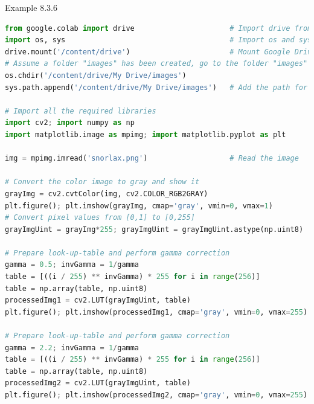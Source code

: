 \documentclass{book}
\begin{document}
\begin{egBox}{Example 8.3.6}{}
    \begin{lstlisting}[language=Python, basicstyle=\ttfamily\small, keywordstyle=\color{blue}, commentstyle=\color{forestgreen}, stringstyle=\color{red}, showstringspaces=false]
from google.colab import drive                      # Import drive from google.colab package
import os, sys                                      # Import os and sys modules
drive.mount('/content/drive')                       # Mount Google Drive
# Assume a folder "images" has been created, go to the folder "images"
os.chdir('/content/drive/My Drive/images')
sys.path.append('/content/drive/My Drive/images')   # Add the path for interpreter to search

# Import all the required libraries
import cv2; import numpy as np
import matplotlib.image as mpimg; import matplotlib.pyplot as plt

img = mpimg.imread('snorlax.png')                   # Read the image

# Convert the color image to gray and show it
grayImg = cv2.cvtColor(img, cv2.COLOR_RGB2GRAY)
plt.figure(); plt.imshow(grayImg, cmap='gray', vmin=0, vmax=1)
# Convert pixel values from [0,1] to [0,255]
grayImgUint = grayImg*255; grayImgUint = grayImgUint.astype(np.uint8)

# Prepare look-up-table and perform gamma correction
gamma = 0.5; invGamma = 1/gamma
table = [((i / 255) ** invGamma) * 255 for i in range(256)]
table = np.array(table, np.uint8)
processedImg1 = cv2.LUT(grayImgUint, table)
plt.figure(); plt.imshow(processedImg1, cmap='gray', vmin=0, vmax=255)

# Prepare look-up-table and perform gamma correction
gamma = 2.2; invGamma = 1/gamma
table = [((i / 255) ** invGamma) * 255 for i in range(256)]
table = np.array(table, np.uint8)
processedImg2 = cv2.LUT(grayImgUint, table)
plt.figure(); plt.imshow(processedImg2, cmap='gray', vmin=0, vmax=255)


\end{lstlisting}
\end{egBox}
\end{document}
